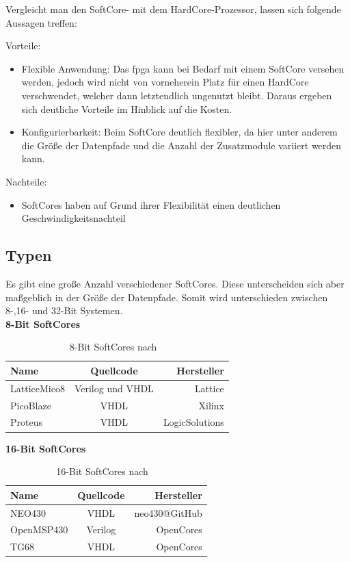 Vergleicht man den SoftCore- mit dem HardCore-Prozessor, lassen sich folgende Aussagen treffen:

Vorteile:
\begin{itemize}
   \item Flexible Anwendung: Das \ac{fpga} kann bei Bedarf mit einem SoftCore versehen werden, jedoch wird nicht von vorneherein Platz für einen HardCore verschwendet, welcher
    dann letztendlich ungenutzt bleibt. Daraus ergeben sich deutliche Vorteile im Hinblick auf die Kosten.
    \item Konfigurierbarkeit: Beim SoftCore deutlich flexibler, da hier unter anderem die Größe der Datenpfade und die Anzahl der Zusatzmodule variiert werden kann.
 \end{itemize}


Nachteile:
\begin{itemize}
  \item SoftCores haben auf Grund ihrer Flexibilität einen deutlichen Geschwindigkeitsnachteil
\end{itemize}

\subsection{Typen}\label{kap:typen}
Es gibt eine große Anzahl verschiedener SoftCores. Diese unterscheiden sich aber maßgeblich in der Größe der Datenpfade.
Somit wird unterschieden zwischen 8-,16- und 32-Bit Systemen.\cite{softcore}\\

\textbf{8-Bit SoftCores}\\
\begin{table}[H]
\centering
\begin{tabular}{|l|c|r|}
  \hline
  \textbf{Name} & \textbf{Quellcode} & \textbf{Hersteller}\\
  \hline
  LatticeMico8 & Verilog und VHDL & Lattice\\
  \hline
  PicoBlaze & VHDL & Xilinx\\
  \hline
  Proteus & VHDL & LogicSolutions\\
  \hline
\end{tabular}
  \caption{8-Bit SoftCores nach ~\cite{softcore}}
 \label{tab:8bitsysteme}
  \end{table}

  \textbf{16-Bit SoftCores}\\
  \begin{table}[H]
  \centering
  \begin{tabular}{|l|c|r|}
    \hline
  \textbf{Name} & \textbf{Quellcode} & \textbf{Hersteller}\\
    \hline
    NEO430 & VHDL & neo430@GitHub\\
    \hline
    OpenMSP430 & Verilog & OpenCores\\
    \hline
    TG68 & VHDL & OpenCores\\
    \hline
  \end{tabular}
    \caption{16-Bit SoftCores nach ~\cite{softcore}}
\label{tab:16bitsysteme}
    \end{table}

